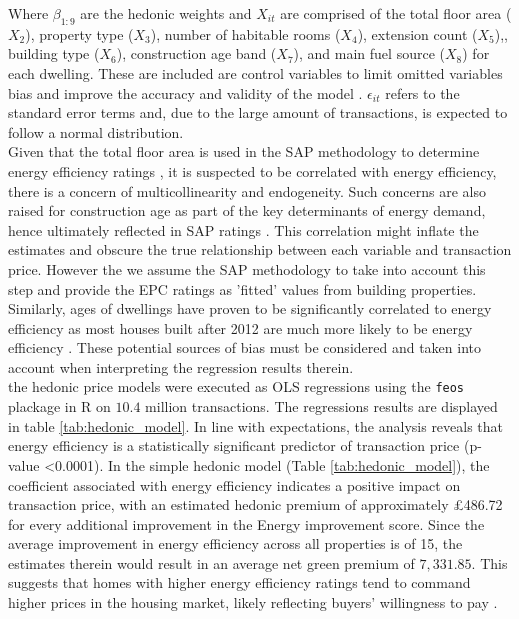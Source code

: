 Where \(\beta_{1:9}\) are the hedonic weights and $X_{it}$ are comprised of the total floor area ($X_2$), property type ($X_3$), number of habitable rooms ($X_4$), extension count ($X_5$),, building type ($X_6$), construction age band ($X_7$), and main fuel source ($X_8$) for each dwelling. These are included are control variables to limit omitted variables bias and improve the accuracy and  validity of the model \cite{wilms_omitted_2021}. $\epsilon_{it}$ refers to the standard error terms and, due to the large amount of transactions, is expected to follow a normal distribution. \\
Given that the total floor area is used in the SAP methodology to determine energy efficiency ratings \cite{bre_group_standard_nodate}, it is suspected to be correlated with energy efficiency, there is a concern of multicollinearity and endogeneity. Such concerns are also raised for construction age as part of the key determinants of energy demand, hence ultimately reflected in SAP ratings \cite{hamilton_energy_2013}. This correlation might inflate the estimates and obscure the true relationship between each variable and transaction price.  However the we assume the SAP methodology to take into account this step and provide the EPC ratings as 'fitted' values from building properties. Similarly, ages of dwellings have proven to be significantly correlated to energy efficiency as most houses built after 2012 are much more likely to be energy efficiency \cite{office_for_national_statistics_age_2022}. These potential sources of bias must be considered and taken into account when interpreting the regression results therein. \\

the hedonic price models were executed as OLS regressions using the \texttt{feos} plackage in R \cite{bergman_reframing_2020, berge_efficient_2018} on $10.4$ million transactions. The regressions results are displayed in table \ref{tab:hedonic_model}.  In line with expectations, the analysis reveals that energy efficiency is a statistically significant predictor of transaction price (p-value \textless 0.0001). In the simple hedonic model (Table \ref{tab:hedonic_model}), the coefficient associated with energy efficiency indicates a positive impact on transaction price, with an estimated hedonic premium of approximately £486.72 for every additional improvement in the Energy improvement score. Since the average improvement in energy efficiency across all properties is of 15, the estimates therein would result in an average net green premium of \textsterling $7,331.85$. This suggests that homes with higher energy efficiency ratings tend to command higher prices in the housing market, likely reflecting buyers' willingness to pay \cite{ghosh_homebuyers_2024}. \\

